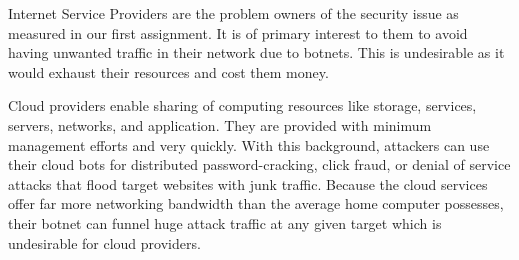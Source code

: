 Internet Service Providers are the problem owners of the security issue as measured in our first assignment. It is of primary interest to them to avoid having unwanted traffic in their network due to botnets. This is undesirable as it would exhaust their resources and cost them money.

Cloud  providers enable sharing of computing resources like storage, services, servers, networks, and application. They are provided with minimum management efforts and very quickly. With this background, attackers can use their cloud bots for distributed password-cracking, click fraud, or denial of service attacks that flood target websites with junk traffic. Because the cloud services offer far more networking bandwidth than the average home computer possesses, their botnet can funnel huge attack traffic at any given target which is undesirable for cloud providers.

